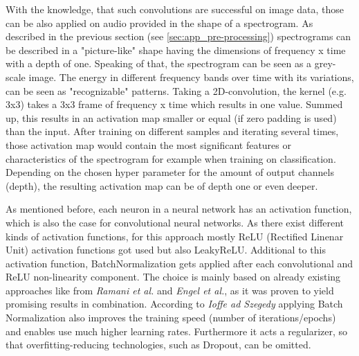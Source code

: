 With the knowledge, that such convolutions are successful on image data, those can be also applied on audio provided in the shape of a spectrogram. As described in the previous section (see \ref{sec:app_pre-processing}) spectrograms can be described in a "picture-like" shape having the dimensions of frequency x time with a depth of one. Speaking of that, the spectrogram can be seen as a grey-scale image. The energy in different frequency bands over time with its variations, can be seen as "recognizable" patterns. 
Taking a 2D-convolution, the kernel (e.g. 3x3) takes a 3x3 frame of frequency x time which results in one value. Summed up, this results in an activation map smaller or equal (if zero padding is used) than the input. After training on different samples and iterating several times, those activation map would contain the most significant features or characteristics of the spectrogram for example when training on classification.
Depending on the chosen hyper parameter for the amount of output channels (depth), the resulting activation map can be of depth one or even deeper. 

As mentioned before, each neuron in a neural network has an activation function, which is also the case for convolutional neural networks. As there exist different kinds of activation functions, for this approach mostly ReLU (Rectified Linenar Unit) activation functions got used but also LeakyReLU. Additional to this activation function, BatchNormalization gets applied after each convolutional and ReLU non-linearity component. The choice is mainly based on already existing approaches like from \textit{Ramani et al.}\cite{Ramani2018} and \textit{Engel et al.}\cite{Engel2017}, as it was proven to yield promising results in combination. According to \textit{Ioffe ad Szegedy} \cite{ioffe2015batch} applying Batch Normalization also improves the training speed (number of iterations/epochs) and enables use much higher learning rates. Furthermore it acts a regularizer, so that overfitting-reducing technologies, such as Dropout, can be omitted.

